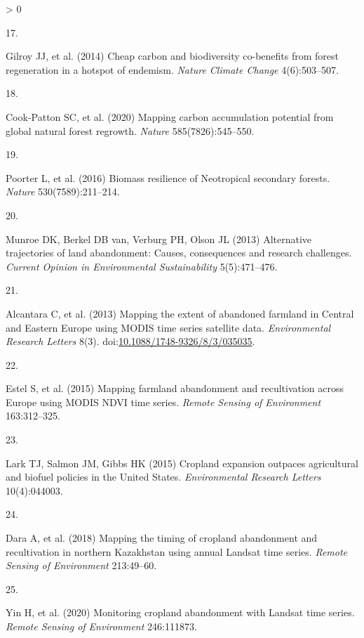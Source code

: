 \documentclass[9pt,twocolumn,twoside,]{pnas-new}
\newlength{\csllabelwidth}
\newlength{\cslhangindent}
\newenvironment{CSLReferences}[2] %
 {%
  \setlength{\parindent}{0pt}
  \ifodd #1 \everypar{\setlength{\hangindent}{\cslhangindent}}\ignorespaces\fi
  \ifnum #2 > 0
  \setlength{\parskip}{#2\baselineskip}
  \fi
 }%
 {}
\newcommand{\CSLLeftMargin}[1]{\parbox[t]{\csllabelwidth}{#1}}
\newcommand{\CSLRightInline}[1]{\parbox[t]{\linewidth - \csllabelwidth}{#1}\break}
\begin{document}
\begin{CSLReferences}{0}{0}
\leavevmode\hypertarget{ref-Gilroy2014}{}%
\CSLLeftMargin{17. }
\CSLRightInline{Gilroy JJ, et al. (2014) {Cheap carbon and biodiversity
co-benefits from forest regeneration in a hotspot of endemism}.
\emph{Nature Climate Change} 4(6):503--507.}

\leavevmode\hypertarget{ref-Cook-Patton2020}{}%
\CSLLeftMargin{18. }
\CSLRightInline{Cook-Patton SC, et al. (2020) {Mapping carbon
accumulation potential from global natural forest regrowth}.
\emph{Nature} 585(7826):545--550.}

\leavevmode\hypertarget{ref-Poorter2016}{}%
\CSLLeftMargin{19. }
\CSLRightInline{Poorter L, et al. (2016) {Biomass resilience of
Neotropical secondary forests}. \emph{Nature} 530(7589):211--214.}

\leavevmode\hypertarget{ref-Munroe2013}{}%
\CSLLeftMargin{20. }
\CSLRightInline{Munroe DK, Berkel DB van, Verburg PH, Olson JL (2013)
{Alternative trajectories of land abandonment: Causes, consequences and
research challenges}. \emph{Current Opinion in Environmental
Sustainability} 5(5):471--476.}

\leavevmode\hypertarget{ref-Alcantara2013}{}%
\CSLLeftMargin{21. }
\CSLRightInline{Alcantara C, et al. (2013) {Mapping the extent of
abandoned farmland in Central and Eastern Europe using MODIS time series
satellite data}. \emph{Environmental Research Letters} 8(3).
doi:\href{https://doi.org/10.1088/1748-9326/8/3/035035}{10.1088/1748-9326/8/3/035035}.}

\leavevmode\hypertarget{ref-Estel2015}{}%
\CSLLeftMargin{22. }
\CSLRightInline{Estel S, et al. (2015) {Mapping farmland abandonment and
recultivation across Europe using MODIS NDVI time series}. \emph{Remote
Sensing of Environment} 163:312--325.}

\leavevmode\hypertarget{ref-Lark2015}{}%
\CSLLeftMargin{23. }
\CSLRightInline{Lark TJ, Salmon JM, Gibbs HK (2015) {Cropland expansion
outpaces agricultural and biofuel policies in the United States}.
\emph{Environmental Research Letters} 10(4):044003.}

\leavevmode\hypertarget{ref-Dara2018}{}%
\CSLLeftMargin{24. }
\CSLRightInline{Dara A, et al. (2018) {Mapping the timing of cropland
abandonment and recultivation in northern Kazakhstan using annual
Landsat time series}. \emph{Remote Sensing of Environment} 213:49--60.}

\leavevmode\hypertarget{ref-Yin2020}{}%
\CSLLeftMargin{25. }
\CSLRightInline{Yin H, et al. (2020) {Monitoring cropland abandonment
with Landsat time series}. \emph{Remote Sensing of Environment}
246:111873.}


\end{CSLReferences}
\end{document}
